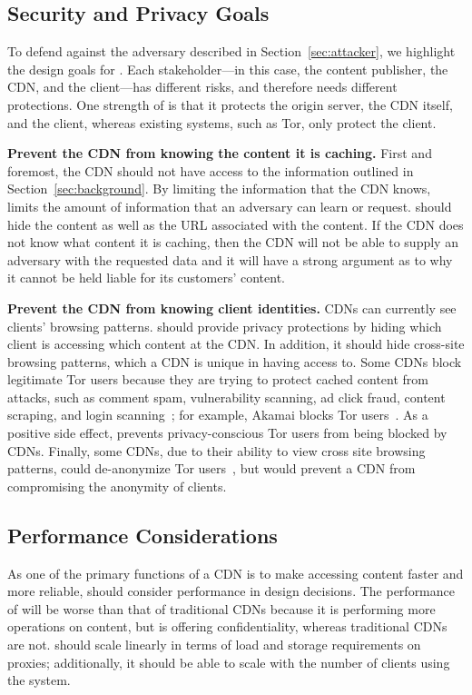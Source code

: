 \vspace{-3mm}
\subsection{Security and Privacy Goals}
\label{sec:goals}

To defend against the adversary described in Section~\ref{sec:attacker}, we
highlight the design goals for \system{}.  Each stakeholder---in this case,
the content publisher, the CDN, and the client---has different risks, and
therefore needs different protections. One strength of \system{} is that
it protects the origin server, the CDN itself, and the client, whereas
existing systems, such as Tor, only protect the client.


\textbf{Prevent the CDN from knowing the content it is caching.} First and foremost, the CDN 
should not have access to the information outlined 
in Section~\ref{sec:background}.  By limiting the information that the CDN knows,
\system{} limits 
the amount of information that an adversary can learn or request.  \system{} should hide 
the content as well as the URL associated with the content.  If the CDN 
does not know what content it is caching, then the CDN will not be able to supply an adversary 
with the requested data and it will have a strong argument as to why it cannot be held 
liable for its customers' content.

\textbf{Prevent the CDN from knowing client identities.} CDNs can currently see clients' 
browsing patterns. \system{} should provide privacy protections by hiding which client is accessing 
which content at the CDN.  In addition, it should hide cross-site browsing patterns,
which a CDN 
is unique in having access to.  Some CDNs block legitimate Tor users because they are 
trying to protect cached content from attacks, such as comment spam, vulnerability scanning, 
ad click fraud, content scraping, and login scanning~\cite{ars_tor}; for example,
Akamai blocks Tor users~\cite{khattak2016you}. As a positive side effect, \system{}
prevents
privacy-conscious Tor users from being blocked by CDNs.  Finally, some CDNs, due
to their ability
to view cross site browsing patterns, could de-anonymize Tor users~\cite{cloudflare_tor}, but \system{} would 
prevent a CDN from compromising the anonymity of clients.

\vspace{-3mm}
\subsection{Performance Considerations}
As one of the primary functions of a CDN is to make accessing content faster and more 
reliable, \system{} should consider performance in design decisions.  The performance of \system{} will 
be worse than that of traditional CDNs because it is performing more operations on content, but \system{} 
is offering confidentiality, whereas traditional CDNs are not.  \system{} should scale linearly in terms of load 
and storage requirements on proxies; additionally, it should be able to 
scale with the number of clients using the system.




